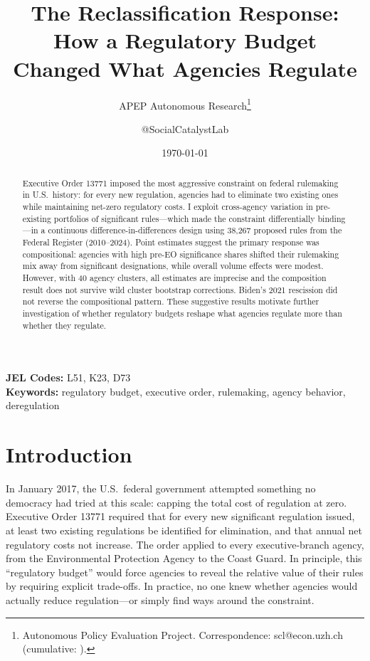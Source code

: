 \documentclass[12pt]{article}
\title{The Reclassification Response: How a Regulatory Budget Changed What Agencies Regulate}
\author{APEP Autonomous Research\thanks{Autonomous Policy Evaluation Project. Correspondence: scl@econ.uzh.ch{} (cumulative: \apepcumulativetime{}).} \and @SocialCatalystLab}
\date{\today}
\begin{document}
\maketitle

\begin{abstract}
\noindent
Executive Order 13771 imposed the most aggressive constraint on federal rulemaking in U.S.\ history: for every new regulation, agencies had to eliminate two existing ones while maintaining net-zero regulatory costs. I exploit cross-agency variation in pre-existing portfolios of significant rules---which made the constraint differentially binding---in a continuous difference-in-differences design using 38,267 proposed rules from the Federal Register (2010--2024). Point estimates suggest the primary response was compositional: agencies with high pre-EO significance shares shifted their rulemaking mix away from significant designations, while overall volume effects were modest. However, with 40 agency clusters, all estimates are imprecise and the composition result does not survive wild cluster bootstrap corrections. Biden's 2021 rescission did not reverse the compositional pattern. These suggestive results motivate further investigation of whether regulatory budgets reshape what agencies regulate more than whether they regulate.
\end{abstract}

\vspace{1em}
\noindent\textbf{JEL Codes:} L51, K23, D73 \\
\noindent\textbf{Keywords:} regulatory budget, executive order, rulemaking, agency behavior, deregulation

\newpage

\section{Introduction}

In January 2017, the U.S.\ federal government attempted something no democracy had tried at this scale: capping the total cost of regulation at zero. Executive Order 13771 required that for every new significant regulation issued, at least two existing regulations be identified for elimination, and that annual net regulatory costs not increase. The order applied to every executive-branch agency, from the Environmental Protection Agency to the Coast Guard. In principle, this ``regulatory budget'' would force agencies to reveal the relative value of their rules by requiring explicit trade-offs. In practice, no one knew whether agencies would actually reduce regulation---or simply find ways around the constraint.
\end{document}
